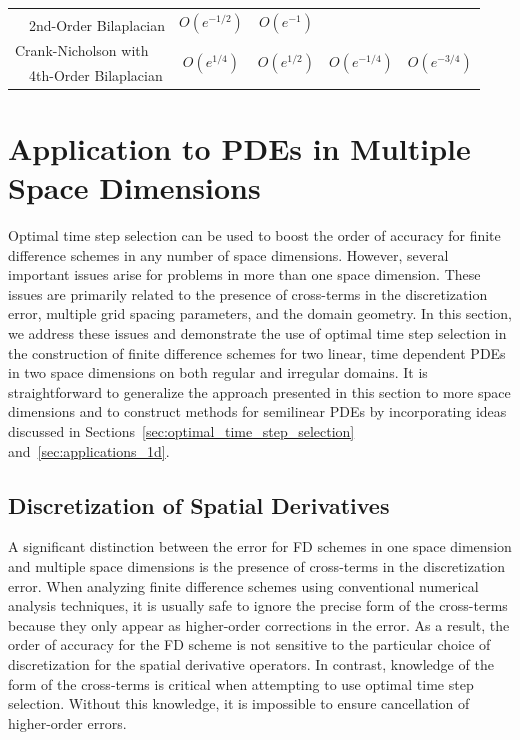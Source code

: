 \documentclass[oneeqnum,onefignum,onetabnum,onethmnum]{siamltex}
\begin{document}
\begin{table}[tbh]
\begin{minipage}{\textwidth}
\begin{center}
\begin{tabular}{|l|c|c|c|c|}
    & \multirow{2}{*}{$O\left( e^{-1/2} \right)$} 
    & \multirow{2}{*}{$O\left( e^{-1} \right)$} \\
  \ \ 2nd-Order Bilaplacian & & & & \\
  \hline 
  Crank-Nicholson with 
    & \multirow{2}{*}{$O\left( e^{1/4} \right)$} 
    & \multirow{2}{*}{$O\left( e^{1/2} \right)$} 
    & \multirow{2}{*}{$O\left( e^{-1/4} \right)$} 
    & \multirow{2}{*}{$O\left( e^{-3/4} \right)$} \\
  \ \ 4th-Order Bilaplacian & & & & \\
  \hline
\end{tabular}
\end{center}
\end{minipage}
\end{table}


\section{\label{sec:applications_multidim}
         Application to PDEs in Multiple Space Dimensions}
Optimal time step selection can be used to boost the order of accuracy for 
finite difference schemes in any number of space dimensions.  However, 
several important issues arise for problems in more than one space dimension.  
These issues are primarily related to the presence of cross-terms in the 
discretization error, multiple grid spacing parameters,  and the domain 
geometry.  In this section, we address these issues and demonstrate the use 
of optimal time step selection in the construction of finite difference 
schemes for two linear, time dependent PDEs in two space dimensions on both 
regular and irregular domains.  It is straightforward to generalize the 
approach presented in this section to more space dimensions and to construct 
methods for semilinear PDEs by incorporating ideas discussed in 
Sections~\ref{sec:optimal_time_step_selection} and~\ref{sec:applications_1d}.  


\subsection{\label{sec:ots_multidim_crossterms}
            Discretization of Spatial Derivatives}
A significant distinction between the error for FD schemes in one space 
dimension and multiple space dimensions is the presence of cross-terms in 
the discretization error.  When analyzing finite difference schemes using 
conventional numerical analysis techniques, it is usually safe to ignore the 
precise form of the cross-terms because they only appear as higher-order 
corrections in the error.  As a result, the order of accuracy for the FD 
scheme is not sensitive to the particular choice of discretization for the 
spatial derivative operators.  In contrast, knowledge of the form of the 
cross-terms is critical when attempting to use optimal time step selection.  
Without this knowledge, it is impossible to ensure cancellation of 
higher-order errors.  
\end{document}
